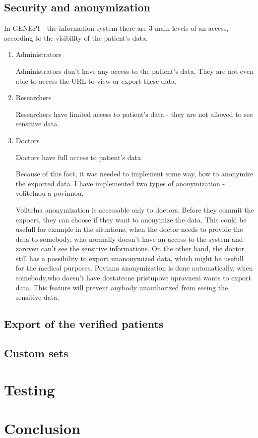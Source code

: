 \documentclass[thesis=B,english]{FITthesis}[2012/10/20]
\begin{document}
\section{Security and anonymization}
In GENEPI - the information system there are 3 main levels of an access, according to the visibility of the patient's data.
\begin{enumerate}
\item{Administrators}

Administrators don't have any access to the patient's data. They are not even able to access the URL to view or export these data.
\item{Researchers}

Researchers have limited access to patient's data - they are not allowed to see sensitive data.
\item{Doctors}

Doctors have full access to patient's data

Because of this fact, it was needed to implement some way, how to anonymize the exported data. I have implemented two types of anonymization - volitelnou a povinnou.

Volitelna anonymization is accessable only to doctors. Before they commit the expoert, they can choose if they want to anonymize the data. This could be usefull for example in the situations, when the doctor needs to provide the data to somebody, who normally doesn't have an access to the system and zaroven can't see the sensitive informations. On the other hand, the doctor still has a possibility to export unanonymized data, which might be usefull for the medical purposes.
Povinna anonymization is done automatically, when somebody,who doesn't have dostatecne pristupove upravneni wants to export data. This feature will prevent anybody unauthorized from seeing the sensitive data.
\end{enumerate}
\section{Export of the verified patients}
\section{Custom sets}
\chapter{Testing}
\chapter{Conclusion}
\end{document}
